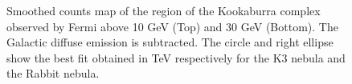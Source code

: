 \clearpage

\begin{figure}[h!]
\centering
{}
\caption{Smoothed counts map of the region of the Kookaburra complex observed by Fermi above 10 GeV (Top) and
30 GeV (Bottom). The Galactic diffuse emission is subtracted. The circle and right ellipse show the best fit obtained in TeV respectively for the K3 nebula and the Rabbit nebula.
\label{fig:K3countsmap}}
\end{figure}

\clearpage

